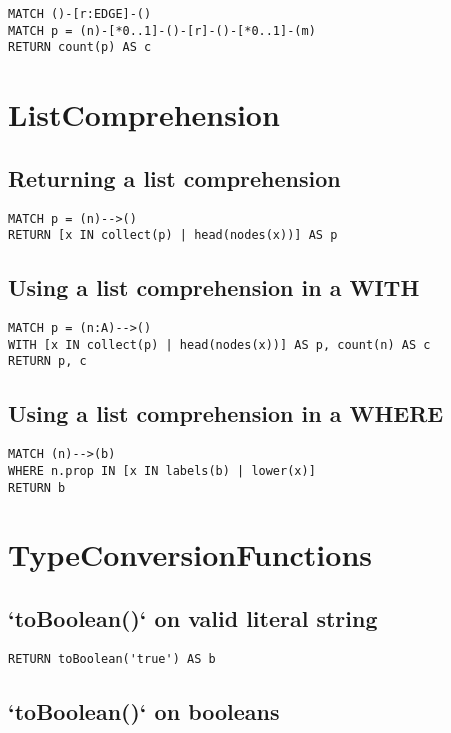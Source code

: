 \begin{lstlisting}
MATCH ()-[r:EDGE]-()
MATCH p = (n)-[*0..1]-()-[r]-()-[*0..1]-(m)
RETURN count(p) AS c
\end{lstlisting}
\section{ListComprehension}


\subsection{Returning a list comprehension}

\begin{lstlisting}
MATCH p = (n)-->()
RETURN [x IN collect(p) | head(nodes(x))] AS p
\end{lstlisting}

\subsection{Using a list comprehension in a WITH}

\begin{lstlisting}
MATCH p = (n:A)-->()
WITH [x IN collect(p) | head(nodes(x))] AS p, count(n) AS c
RETURN p, c
\end{lstlisting}

\subsection{Using a list comprehension in a WHERE}

\begin{lstlisting}
MATCH (n)-->(b)
WHERE n.prop IN [x IN labels(b) | lower(x)]
RETURN b
\end{lstlisting}
\section{TypeConversionFunctions}


\subsection{`toBoolean()` on valid literal string}

\begin{lstlisting}
RETURN toBoolean('true') AS b
\end{lstlisting}

\subsection{`toBoolean()` on booleans}

